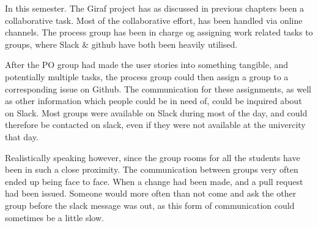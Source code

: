 In this semester.
The Giraf project has as discussed in previous chapters been a collaborative task.
Most of the collaborative effort, has been handled via online channels.
The process group has been in charge og assigning work related tasks to groups, where Slack \& github have both been heavily utilised.

After the PO group had made the user stories into something tangible, and potentially multiple tasks, the process group could then assign a group to a corresponding issue on Github.
The communication for these assignments, as well as other information which people could be in need of, could be inquired about on Slack.
Most groups were available on Slack during most of the day, and could therefore be contacted on slack, even if they were not available at the univercity that day.

Realistically speaking however, since the group rooms for all the students have been in such a close proximity.
The communication between groups very often ended up being face to face.
When a change had been made, and a pull request had been issued.
Someone would more often than not come and ask the other group before the slack message was out, as this form of communication could sometimes be a little slow.


